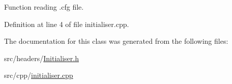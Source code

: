 Function reading .cfg file. 



Definition at line 4 of file initialiser.\+cpp.



The documentation for this class was generated from the following files\+:\begin{DoxyCompactItemize}
\item 
src/headers/\hyperlink{Initialiser_8h}{Initialiser.\+h}\item 
src/cpp/\hyperlink{initialiser_8cpp}{initialiser.\+cpp}\end{DoxyCompactItemize}
